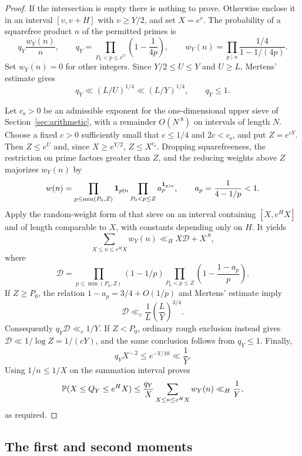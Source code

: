 \begin{proof}
If the intersection is empty there is nothing to prove.  Otherwise
enclose it in an interval $[v,v+H]$ with $v\ge Y/2$, and set
$X=e^v$.  The probability of a squarefree product $n$ of the permitted
primes is
\[
 q_Y\frac{w_Y(n)}n,
 \qquad
 q_Y=\prod_{P_0<p\le e^U}\left(1-\frac1{4p}\right),
 \qquad
 w_Y(n)=\prod_{p\mid n}\frac{1/4}{1-1/(4p)}.
\]
Set $w_Y(n)=0$ for other integers.  Since $Y/2\le U\le Y$ and
$U\ge L$, Mertens' estimate gives
\[
 q_Y\ll (L/U)^{1/4}\ll (L/Y)^{1/4},
 \qquad q_Y\le1.
\]

Let $c_{\mathrm{s}}>0$ be an admissible exponent for the
one-dimensional upper sieve of Section~\ref{sec:arithmetic}, with a
remainder $O(N^{.8})$ on intervals of length $N$.  Choose a fixed
$c>0$ sufficiently small that $c\le1/4$ and $2c<c_{\mathrm{s}}$, and
put $Z=e^{cY}$.  Then $Z\le e^U$ and, since $X\ge e^{Y/2}$,
$Z\le X^{c_{\mathrm{s}}}$.  Dropping squarefreeness, the restriction on
prime factors greater than $Z$, and the reducing weights above $Z$
majorizes $w_Y(n)$ by
\[
 w(n)=
 \prod_{p\le\min(P_0,Z)}\mathbf 1_{p\nmid n}
 \prod_{P_0<p\le Z} a_p^{\mathbf 1_{p\mid n}},
 \qquad a_p=\frac1{4-1/p}<1.
\]
Apply the random-weight form of that sieve on an interval containing
$[X,e^H X]$ and of length comparable to $X$, with constants depending
only on $H$.  It yields
\[
 \sum_{X\le n\le e^H X}w_Y(n)
 \ll_H X\mathcal D+X^{.8},
\]
where
\[
 \mathcal D=
 \prod_{p\le\min(P_0,Z)}(1-1/p)
 \prod_{P_0<p\le Z}\left(1-\frac{1-a_p}{p}\right).
\]
If $Z\ge P_0$, the relation $1-a_p=3/4+O(1/p)$ and Mertens'
estimate imply
\[
 \mathcal D\ll_c
 \frac1L\left(\frac{L}{Y}\right)^{3/4}.
\]
Consequently $q_Y\mathcal D\ll_c1/Y$.  If $Z<P_0$, ordinary rough
exclusion instead gives $\mathcal D\ll1/\log Z=1/(cY)$, and the same
conclusion follows from $q_Y\le1$.  Finally,
\[
 q_Y X^{-.2}\le e^{-Y/10}\ll\frac1Y.
\]
Using $1/n\le1/X$ on the summation interval proves
\[
 \mathbb P(X\le Q_Y\le e^H X)
 \le\frac{q_Y}{X}\sum_{X\le n\le e^H X}w_Y(n)
 \ll_H\frac1Y,
\]
as required.
\end{proof}

\subsection{The first and second moments}

